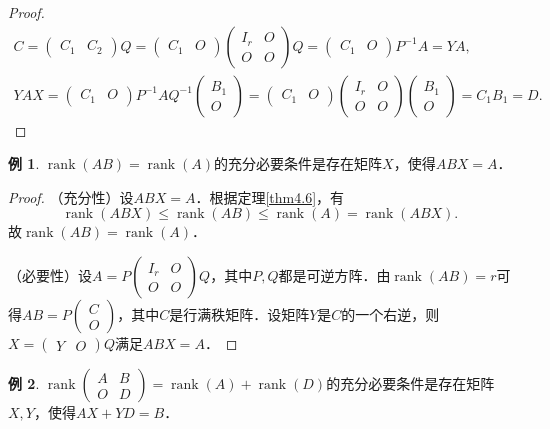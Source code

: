 \documentclass[a4paper,fontset=windows]{ctexbook}
\theoremstyle{definition}
\newtheorem{example}{例}[chapter]
\DeclareMathOperator{\rank}{rank}
\renewcommand{\le}{\leqslant}
\begin{document}
\begin{proof}
\begin{gather*}
C=\begin{pmatrix}C_1&C_2\end{pmatrix}Q=\begin{pmatrix}C_1&O\end{pmatrix}\begin{pmatrix}I_r&O \\ O&O\end{pmatrix}Q=\begin{pmatrix}C_1&O\end{pmatrix}P^{-1}A=YA, \\
YAX=\begin{pmatrix}C_1&O\end{pmatrix}P^{-1}AQ^{-1}\begin{pmatrix}B_1 \\ O\end{pmatrix}=\begin{pmatrix}C_1&O\end{pmatrix}\begin{pmatrix}I_r&O \\ O&O\end{pmatrix}\begin{pmatrix}B_1 \\ O\end{pmatrix}=C_1B_1=D.
\end{gather*}
\end{proof}

\begin{example}
$\rank(AB)=\rank(A)$的充分必要条件是存在矩阵$X$，使得$ABX=A$．
\end{example}

\begin{proof}
（充分性）设$ABX=A$．根据定理\ref{thm4.6}，有
$$\rank(ABX)\le\rank(AB)\le\rank(A)=\rank(ABX).$$
故$\rank(AB)=\rank(A)$．

（必要性）设$A=P\begin{pmatrix}I_r&O \\ O&O\end{pmatrix}Q$，其中$P,Q$都是可逆方阵．由$\rank(AB)=r$可得$AB=P\begin{pmatrix}C \\ O\end{pmatrix}$，其中$C$是行满秩矩阵．设矩阵$Y$是$C$的一个右逆，则$X=\begin{pmatrix}Y&O\end{pmatrix}Q$满足$ABX=A$．
\end{proof}

\begin{example}\label{ex4.8}
$\rank\begin{pmatrix}A&B \\ O&D\end{pmatrix}=\rank(A)+\rank(D)$的充分必要条件是存在矩阵$X,Y$，使得$AX+YD=B$．
\end{example}
\end{document}
